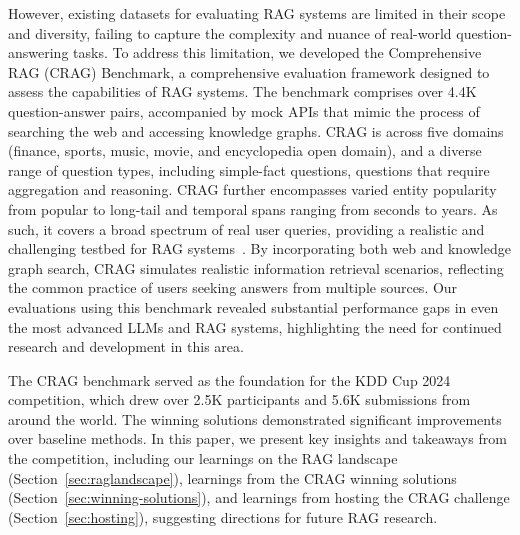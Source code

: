 However, existing datasets for evaluating RAG systems are limited in their scope and diversity, failing to capture the complexity and nuance of real-world question-answering tasks. To address this limitation, we developed the Comprehensive RAG (CRAG) Benchmark, a comprehensive evaluation framework designed to assess the capabilities of RAG systems. The benchmark comprises over 4.4K question-answer pairs, accompanied by mock APIs that mimic the process of searching the web and accessing knowledge graphs. 
CRAG is across five domains (finance, sports, music, movie, and encyclopedia open domain), and a diverse range of question types, including simple-fact questions, questions that require aggregation and reasoning. 
CRAG further encompasses varied entity popularity from popular to long-tail and temporal spans ranging from seconds to years. As such, it covers a broad spectrum of real user queries, providing a realistic and challenging testbed for RAG systems~\cite{yang2024crag}. By incorporating both web and knowledge graph search, CRAG simulates realistic information retrieval scenarios, reflecting the common practice of users seeking answers from multiple sources. 
Our evaluations using this benchmark revealed substantial performance gaps in even the most advanced LLMs and RAG systems, highlighting the need for continued research and development in this area.

The CRAG benchmark served as the foundation for the KDD Cup 2024 competition, which drew over 2.5K participants and 5.6K submissions from around the world. The winning solutions demonstrated significant improvements over baseline methods. In this paper, we present key insights and takeaways from the competition, including our learnings on the RAG landscape (Section~\ref{sec:raglandscape}), learnings from the CRAG winning solutions (Section~\ref{sec:winning-solutions}), and learnings from hosting the CRAG challenge (Section~\ref{sec:hosting}), suggesting directions for future RAG research.


